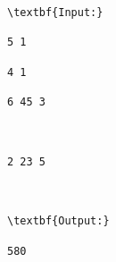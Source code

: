 \begin{verbatim}
\textbf{Input:}

5 1

4 1

6 45 3



2 23 5



\textbf{Output:}

580

\end{verbatim}
